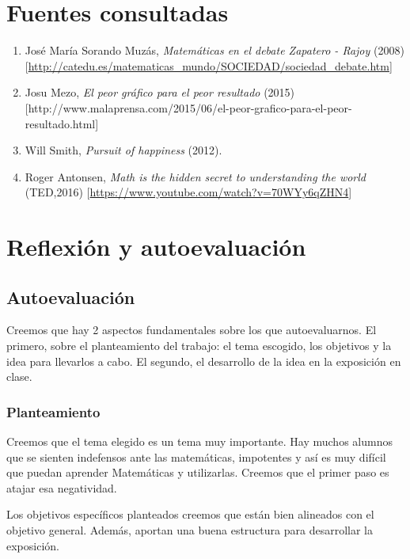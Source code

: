 \newpage
\section{Fuentes consultadas}

\begin{enumerate}
\item José María Sorando Muzás, \textit{Matemáticas en el debate Zapatero - Rajoy} (2008) [\url{http://catedu.es/matematicas_mundo/SOCIEDAD/sociedad_debate.htm}]
\item Josu Mezo, \textit{El peor gráfico para el peor resultado} (2015) [http://www.malaprensa.com/2015/06/el-peor-grafico-para-el-peor-resultado.html]
\item Will Smith, \textit{Pursuit of happiness} (2012).
\item Roger Antonsen, \textit{Math is the hidden secret to understanding the world } (TED,2016) [\url{https://www.youtube.com/watch?v=70WYy6qZHN4}]
\end{enumerate}

\section{Reflexión y autoevaluación}


\subsection{Autoevaluación}

Creemos que hay 2 aspectos fundamentales sobre los que autoevaluarnos. 
%
El primero, sobre el planteamiento del trabajo: el tema escogido, los objetivos y la idea para llevarlos a cabo.
%
El segundo, el desarrollo de la idea en la exposición en clase.

\subsubsection{Planteamiento}

Creemos que el tema elegido es un tema muy importante.
%
Hay muchos alumnos que se sienten indefensos ante las matemáticas, impotentes y así es muy difícil que puedan aprender Matemáticas y utilizarlas. Creemos que el primer paso es atajar esa negatividad.

Los objetivos específicos planteados creemos que están bien alineados con el objetivo general. 
%
Además, aportan una buena estructura para desarrollar la exposición.

